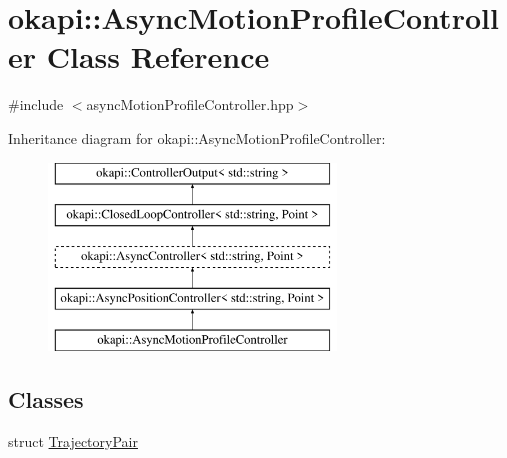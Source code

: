 \hypertarget{classokapi_1_1AsyncMotionProfileController}{}\section{okapi\+::Async\+Motion\+Profile\+Controller Class Reference}
\label{classokapi_1_1AsyncMotionProfileController}


{\ttfamily \#include $<$async\+Motion\+Profile\+Controller.\+hpp$>$}

Inheritance diagram for okapi\+::Async\+Motion\+Profile\+Controller\+:\begin{figure}[H]
\begin{center}
\leavevmode
\includegraphics[height=5.000000cm]{classokapi_1_1AsyncMotionProfileController}
\end{center}
\end{figure}
\subsection*{Classes}
\begin{DoxyCompactItemize}
\item 
struct \mbox{\hyperlink{structokapi_1_1AsyncMotionProfileController_1_1TrajectoryPair}{Trajectory\+Pair}}
\end{DoxyCompactItemize}

